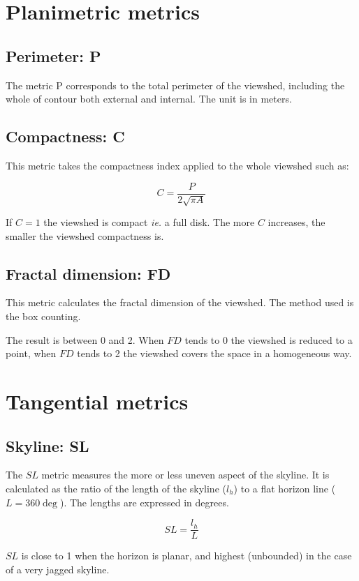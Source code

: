 \documentclass{report}
\begin{document}
\section{Planimetric metrics}

\subsection{Perimeter: P}

The metric P corresponds to the total perimeter of the viewshed, including the whole of contour both external and internal. The unit is in meters.


\subsection{Compactness: C}
This metric takes the compactness index applied to the whole viewshed such as:

$$C=\frac{P}{2\sqrt{\pi A}}$$

If $C=1$ the viewshed is compact \textit{ie.} a full disk. The more $C$ increases, the smaller the viewshed compactness is.


\subsection{Fractal dimension: FD}
This metric calculates the fractal dimension of the viewshed. The method used is the box counting.

The result is between 0 and 2. When $FD$ tends to 0 the viewshed is reduced to a point, when $FD$ tends to 2 the viewshed covers the space in a homogeneous way.

\section{Tangential metrics}

\subsection{Skyline: SL}

The $SL$ metric measures the more or less uneven aspect of the skyline. It is calculated as the ratio of the length of the skyline ($l_h$) to a flat horizon line ($L = 360\deg$). The lengths are expressed in degrees.

$$SL=\frac{l_h}{L}$$

$SL$ is close to 1 when the horizon is planar, and highest (unbounded) in the case of a very jagged skyline.
\end{document}
